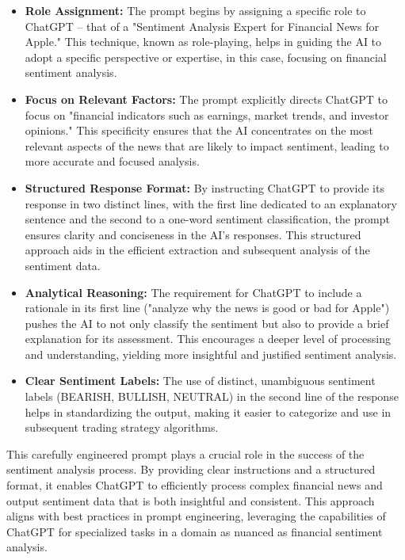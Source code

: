 \begin{itemize}
    \item \textbf{Role Assignment:} The prompt begins by assigning a specific role to ChatGPT – that of a "Sentiment Analysis Expert for Financial News for Apple." This technique, known as role-playing, helps in guiding the AI to adopt a specific perspective or expertise, in this case, focusing on financial sentiment analysis.
    
    \item \textbf{Focus on Relevant Factors:} The prompt explicitly directs ChatGPT to focus on "financial indicators such as earnings, market trends, and investor opinions." This specificity ensures that the AI concentrates on the most relevant aspects of the news that are likely to impact sentiment, leading to more accurate and focused analysis.
    
    \item \textbf{Structured Response Format:} By instructing ChatGPT to provide its response in two distinct lines, with the first line dedicated to an explanatory sentence and the second to a one-word sentiment classification, the prompt ensures clarity and conciseness in the AI's responses. This structured approach aids in the efficient extraction and subsequent analysis of the sentiment data.
    
    \item \textbf{Analytical Reasoning:} The requirement for ChatGPT to include a rationale in its first line ("analyze why the news is good or bad for Apple") pushes the AI to not only classify the sentiment but also to provide a brief explanation for its assessment. This encourages a deeper level of processing and understanding, yielding more insightful and justified sentiment analysis.
    
    \item \textbf{Clear Sentiment Labels:} The use of distinct, unambiguous sentiment labels (BEARISH, BULLISH, NEUTRAL) in the second line of the response helps in standardizing the output, making it easier to categorize and use in subsequent trading strategy algorithms.
\end{itemize}


This carefully engineered prompt plays a crucial role in the success of the sentiment analysis process. By providing clear instructions and a structured format, it enables ChatGPT to efficiently process complex financial news and output sentiment data that is both insightful and consistent. This approach aligns with best practices in prompt engineering, leveraging the capabilities of ChatGPT for specialized tasks in a domain as nuanced as financial sentiment analysis.


